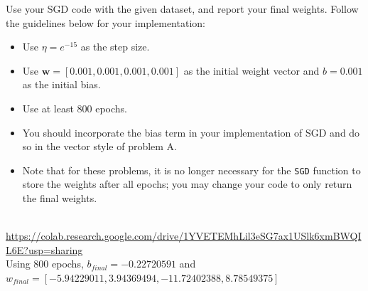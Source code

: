 \begin{problem}[6]
  Use your SGD code with the given dataset, and report your final weights. Follow the guidelines below for your implementation:

  \begin{itemize}
    \item Use $\eta = e^{-15}$ as the step size.  
    \item Use $\mathbf{w} = [0.001, 0.001, 0.001, 0.001]$ as the initial weight vector and $b = 0.001$ as the initial bias.
    \item Use at least 800 epochs.
    \item You should incorporate the bias term in your implementation of SGD and do so in the vector style of problem A.
    \item Note that for these problems, it is no longer necessary for the \texttt{SGD} function to store the weights after all epochs; you may change your code to only return the final weights.
  \end{itemize}
\end{problem}
\begin{solution}
  \\
  \url{https://colab.research.google.com/drive/1YVETEMhLil3eSG7ax1USlk6xmBWQIL6E?usp=sharing} \\
  Using 800 epochs, $b_{final} = -0.22720591$ and $w_{final} = [-5.94229011, 3.94369494, -11.72402388, 8.78549375]$
  
\end{solution}

